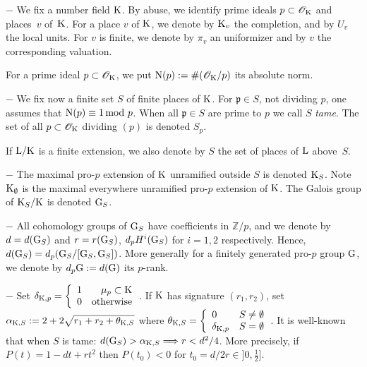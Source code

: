 \documentclass[12pt,a4paper,twoside,english]{smfart}
\def\Z{{\mathbb Z}}
\def\p{{\mathfrak p}}
\def\N{{\rm N}}
\def\G{{\rm G}}
\def\K{{\rm K}}
\def\L{{\rm L}}
\def\O{{\mathcal O}}
\begin{document}
\medskip

$-$ We fix  a number field $\K$. By abuse, we identify prime ideals $\p \subset \O_\K$ and places~$v$ of~$\K$.  For a place $v$ of $\K$, we denote by $\K_v$ the completion,  and by $U_v$ the local units.  For  $v$ is finite, we denote by 
 $\pi_v$ an uniformizer and  by $v$ the corresponding valuation.

For a prime ideal $\p\subset \O_\K$, we put $\N(\p):=\# (\O_\K/\p)$ its absolute norm.
\color{black} 
\medskip

$-$ 
We fix now a finite set $S$ of finite places of $\K$.
For $\p \in S$, not dividing $p$, one assumes that $\N(\p) \equiv 1 \,{\rm mod} \ p$. 
When all $\p \in S$ are prime to $p$ we call $S$ {\it tame}. 
The set of all $\p \subset \O_\K $ dividing $(p)$ is denoted $S_p$.

If $\L/\K$ is a finite extension, we also denote by $S$ the set of places of $\L$ above~$S$.

\medskip

$-$ 
The maximal pro-$p$ extension of $\K$ unramified outside $S$ is denoted $\K_S$. Note $\K_\emptyset$ is the maximal everywhere unramified pro-$p$ extension of $\K$.
The Galois group of $\K_S/\K$
is denoted $\G_S$. 

\medskip

$-$
All cohomology groups of $\G_S$ have coefficients in $\Z/p$, and
we denote by $d=d(\G_S)$ and $r=r(\G_S)$, $d_p H^i(\G_S)$ for $i=1,2$ respectively.
Hence, $d(\G_S)=d_p (\G_S/[\G_S,\G_S])$. More generally for a finitely generated pro-$p$ group $\G$, we denote by $d_p \G:= d(\G)$ its $p$-rank.


\medskip

$-$ 
Set 
$\delta_{\K,p}= \left\{ \begin{array}{rr} 1 & \mu_p \subset \K  \\
0 & \rm{otherwise} \end{array} \right.$.
If $\K$ has signature $(r_1,r_2)$, set $\alpha_{\K,S}:=2+2 \sqrt{r_1+r_2+\theta_{\K,S}}$
where $\theta_{\K,S}=\left\{ \begin{array}{ll} 0 & S \neq \emptyset  \\
\delta_{\K,p} & S=\emptyset \end{array} \right.$.
It is well-known that  when $S$ is tame: $d(\G_S) > \alpha_{\K,S} \Longrightarrow r <  d^2/4$. More precisely, if $P(t)=1-dt+rt^2$ then  $P(t_0)<0$ for $\displaystyle{t_0=d/2r \in  ]0,\frac{1}{2}]}$. 


\medskip
\end{document}
